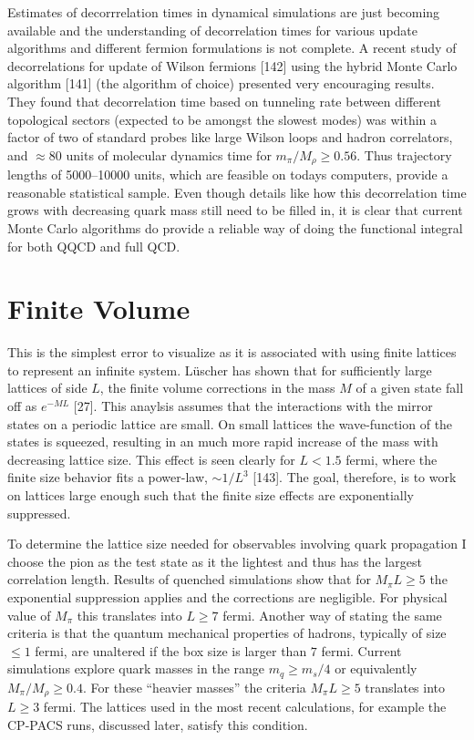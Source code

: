 Estimates of decorrrelation times in dynamical simulations are just becoming available and the understanding of decorrelation times for various update algorithms and different fermion formulations is not complete. A recent study of decorrelations for update of Wilson fermions [142] using the hybrid Monte Carlo algorithm [141] (the algorithm of choice) presented very encouraging results. They found that decorrelation time based on tunneling rate between different topological sectors (expected to be amongst the slowest modes) was within a factor of two of standard probes like large Wilson loops and hadron correlators, and $\approx 80$ units of molecular dynamics time for $m_\pi / M_\rho \ge 0.56$. Thus trajectory lengths of 5000--10000 units, which are feasible on todays computers, provide a reasonable statistical sample. Even though details like how this decorrelation time grows with decreasing quark mass still need to be filled in, it is clear that current Monte Carlo algorithms do provide a reliable way of doing the functional integral for both QQCD and full QCD.

\section{Finite Volume}

This is the simplest error to visualize as it is associated with using finite lattices to represent an infinite system. L\"uscher has shown that for sufficiently large lattices of side $L$, the finite volume corrections in the mass $M$ of a given state fall off as $e^{-ML}$ [27]. This anaylsis assumes that the interactions with the mirror states on a periodic lattice are small. On small lattices the wave-function of the states is squeezed, resulting in an much more rapid increase of the mass with decreasing lattice size. This effect is seen clearly for $L < 1.5$ fermi, where the finite size behavior fits a power-law, $\sim 1/L^3$ [143]. The goal, therefore, is to work on lattices large enough such that the finite size effects are exponentially suppressed.

To determine the lattice size needed for observables involving quark propagation I choose the pion as the test state as it the lightest and thus has the largest correlation length. Results of quenched simulations show that for $M_\pi L \ge 5$ the exponential suppression applies and the corrections are negligible. For physical value of $M_\pi$ this translates into $L \ge 7$ fermi. Another way of stating the same criteria is that the quantum mechanical properties of hadrons, typically of size $\le 1$ fermi, are unaltered if the box size is larger than $7$ fermi. Current simulations explore quark masses in the range $m_q \ge m_s/4$ or equivalently $M_\pi / M_\rho \ge 0.4$. For these ``heavier masses'' the criteria $M_\pi L \ge 5$ translates into $L \ge 3$ fermi. The lattices used in the most recent calculations, for example the CP-PACS runs, discussed later, satisfy this condition.


